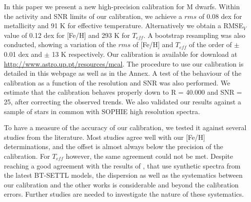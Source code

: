 \documentclass{aa}
\begin{document}
In this paper we present a new high-precision calibration for M dwarfs. Within the activity and SNR limits of our calibration, we achieve a $rms$ of 0.08 dex for metallicity and 91 K for effective temperature. Alternatively we obtain a RMSE$_{V}$ value of 0.12 dex for [Fe/H] and 293 K for $T_{eff}$. A bootstrap resampling was also conducted, showing a variation of the $rms$ of [Fe/H] and $T_{eff}$ of the order of $\pm$ 0.01 dex and $\pm$ 13 K respectively. Our calibration is available for download at \url{http://www.astro.up.pt/resources/mcal}. The procedure to use our calibration is detailed in this webpage as well as in the Annex. A test of the behaviour of the calibration as a function of the resolution and SNR was also performed. We estimate that the calibration behaves properly down to R = 40.000 and SNR = 25, after correcting the observed trends. We also validated our results against a sample of stars in common with SOPHIE high resolution spectra.


To have a measure of the accuracy of our calibration, we tested it against several studies from the literature. Most studies agree well with our [Fe/H] determinations, and the offset is almost always below the precision of the calibration. For $T_{eff}$ however, the same agreement could not be met. Despite reaching a good agreement with the results of \citet{Rajpurohit-2013a}, that use synthetic spectra from the latest BT-SETTL models, the dispersion as well as the systematics between our calibration and the other works is considerable and beyond the calibration errors. Further studies are needed to investigate the nature of these systematics. 






\end{document}
